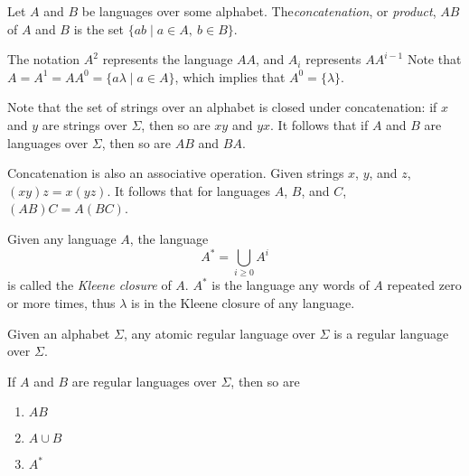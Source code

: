 \documentclass{bcthesis}
\renewcommand{\meo}[1]{}
\newcommand{\footcite}[2]{\footnote{\cite[pg.~{#2}]{#1}}}
\renewcommand{\footcite}[2]{\cite[pg.~{#2}]{#1}}
\begin{document}
	\begin{definition}
		Let $A$ and $B$ be languages over some alphabet.
		The\textit{concatenation}, or \textit{product}, $AB$ of $A$ and $B$ is the set $\{ ab \mid a \in A, \ b \in B \}$.\footcite{lemmings}{3}

		The notation $A^2$ represents the language $AA$, and $A_i$ represents $AA^{i-1}$
		Note that $A = A^1 = AA^0 = \{ a \lambda \mid a \in A \}$, which implies that $A^0 = \{ \lambda \}$.\footcite{lemmings}{3}
	\end{definition}

	\begin{remark}
		Note that the set of strings over an alphabet is closed under concatenation: if $x$ and $y$ are strings over $\Sigma$, then so are $xy$ and $yx$.
		It follows that if $A$ and $B$ are languages over $\Sigma$, then so are $AB$ and $BA$.\footcite{lemmings}{2}
		
		Concatenation is also an associative operation.
		Given strings $x$, $y$, and $z$, $(xy)z = x(yz)$.
		It follows that for languages $A$, $B$, and $C$, $(AB)C = A(BC)$.\footcite{lemmings}{2}

		\meo{
			Maybe also note that length has the properties of the logarithm with regard to concatenation.
			It's a curiosity, but not really useful information
		}
	\end{remark}

	\begin{definition}
		Given any language $A$, the language 
		\[
			A^* = \bigcup_{i \geq 0} A^i
		\]
		is called the \textit{Kleene closure} of $A$.
		$A^*$ is the language any words of $A$ repeated zero or more times, thus $\lambda$ is in the Kleene closure of any language.\footcite{lemmings}{3}
		\meo{Maybe note that that the star operator is referred to as the Kleene star.}
	\end{definition}

	\begin{definition}
		Given an alphabet $\Sigma$, any atomic regular language over $\Sigma$ is a regular language over $\Sigma$.
		
		If $A$ and $B$ are regular languages over $\Sigma$, then so are 
		\begin{enumerate}[label=(\roman*), itemsep = -0.3 ex, nolistsep]
			\item $AB$
			\item $A \cup B$
			\item $A^*$
		\end{enumerate}
		\footcite{rosen}{879}
	\end{definition}
\end{document}
